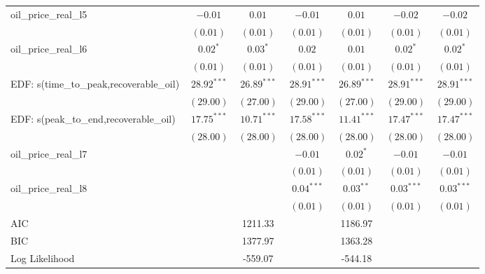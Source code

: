 \documentclass[12pt]{article}
\begin{document}
\begin{table}
\begin{center}
\begin{tabular}{l c c c c c c }
oil_price_real_l5                    & $-0.01$       & $0.01$        & $-0.01$       & $0.01$        & $-0.02$       & $-0.02$       \\
                                     & $(0.01)$      & $(0.01)$      & $(0.01)$      & $(0.01)$      & $(0.01)$      & $(0.01)$      \\
oil_price_real_l6                    & $0.02^{*}$    & $0.03^{*}$    & $0.02$        & $0.01$        & $0.02^{*}$    & $0.02^{*}$    \\
                                     & $(0.01)$      & $(0.01)$      & $(0.01)$      & $(0.01)$      & $(0.01)$      & $(0.01)$      \\
EDF: s(time_to_peak,recoverable_oil) & $28.92^{***}$ & $26.89^{***}$ & $28.91^{***}$ & $26.89^{***}$ & $28.91^{***}$ & $28.91^{***}$ \\
                                     & $(29.00)$     & $(27.00)$     & $(29.00)$     & $(27.00)$     & $(29.00)$     & $(29.00)$     \\
EDF: s(peak_to_end,recoverable_oil)  & $17.75^{***}$ & $10.71^{***}$ & $17.58^{***}$ & $11.41^{***}$ & $17.47^{***}$ & $17.47^{***}$ \\
                                     & $(28.00)$     & $(28.00)$     & $(28.00)$     & $(28.00)$     & $(28.00)$     & $(28.00)$     \\
oil_price_real_l7                    &               &               & $-0.01$       & $0.02^{*}$    & $-0.01$       & $-0.01$       \\
                                     &               &               & $(0.01)$      & $(0.01)$      & $(0.01)$      & $(0.01)$      \\
oil_price_real_l8                    &               &               & $0.04^{***}$  & $0.03^{**}$   & $0.03^{***}$  & $0.03^{***}$  \\
                                     &               &               & $(0.01)$      & $(0.01)$      & $(0.01)$      & $(0.01)$      \\
\hline
AIC                                  &               & 1211.33       &               & 1186.97       &               &               \\
BIC                                  &               & 1377.97       &               & 1363.28       &               &               \\
Log Likelihood                       &               & -559.07       &               & -544.18       &               &               \\

\end{tabular}
\end{center}
\end{table}
\end{document}
